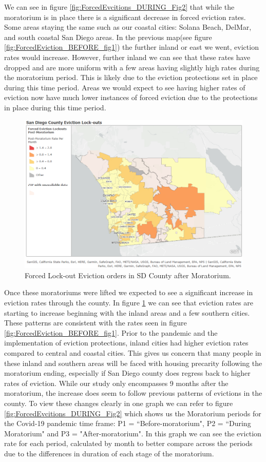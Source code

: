 \documentclass[man, 12pt, donotrepeattitle, floatsintext]{apa7} %
\begin{document}
We can see in figure \ref{fig:ForcedEvcitions_DURING_Fig2} that while the moratorium is in place there is a significant decrease in forced eviction rates. Some areas staying the same such as our coastal cities: Solana Beach, DelMar, and south coastal San Diego areas. In the previous map(see figure \ref{fig:ForcedEviction_BEFORE_fig1}) the further inland or east we went, eviction rates would increase. However, further inland we can see that these rates have dropped and are more uniform with a few areas having slightly high rates during the moratorium period. This is likely due to the eviction protections set in place during this time period. Areas we would expect to see having higher rates of eviction now have much lower instances of forced eviction due to the protections in place during this time period.

\begin{figure}[H]
  \includegraphics[width=\linewidth]{figures/gis_post_figure3.png}
  \caption{Forced Lock-out Eviction orders in SD County after Moratorium.}
  \label{fig:ForcedEvictions_AFTER_fig3}
\end{figure}
Once these moratoriums were lifted we expected to see a significant increase in eviction rates through the county. In figure \ref{fig:ForcedEvictions_AFTER_fig3} we can see that eviction rates are starting to increase beginning with the inland areas and a few southern cities. These patterns are consistent with the rates seen in figure \ref{fig:ForcedEviction_BEFORE_fig1}. Prior to the pandemic and the implementation of eviction protections, inland cities had higher eviction rates compared to central and coastal cities. This gives us concern that many people in these inland and southern areas will be faced with housing precarity following the moratorium ending, especially if San Diego county does regress back to higher rates of eviction. While our study only encompasses 9 months after the moratorium, the increase does seem to follow previous patterns of evictions in the county. To view these changes clearly in one graph we can refer to figure \ref{fig:ForcedEvcitions_DURING_Fig2} which shows us the Moratorium periods for the Covid-19 pandemic time frame: P1 = “Before-moratorium", P2 = “During Moratorium" and P3 = "After-moratorium". In this graph we can see the eviction rate for each period, calculated by month to better compare across the periods due to the differences in duration of each stage of the moratorium.
\end{document}
